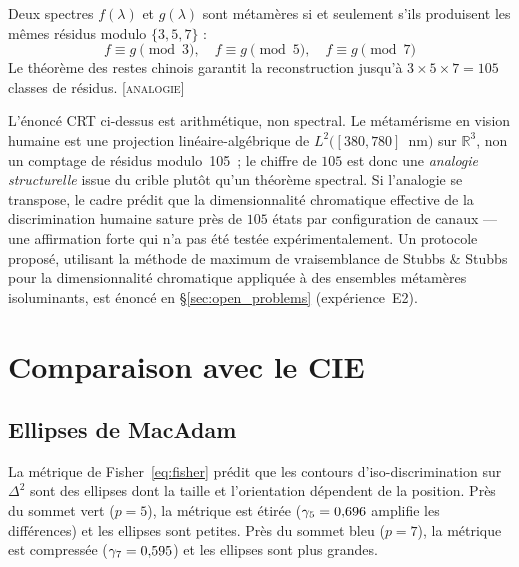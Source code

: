 \documentclass[12pt,a4paper]{article}
\begin{document}
\begin{theorembox}
Deux spectres $f(\lambda)$ et $g(\lambda)$ sont m\'etam\`eres si et
seulement s'ils produisent les m\^emes r\'esidus modulo $\{3, 5, 7\}$ :
\begin{equation}
  f \equiv g \pmod{3}, \quad
  f \equiv g \pmod{5}, \quad
  f \equiv g \pmod{7}
\end{equation}
Le th\'eor\`eme des restes chinois garantit la reconstruction jusqu'\`a
$3 \times 5 \times 7 = 105$ classes de r\'esidus. \textsc{[analogie]}
\end{theorembox}

\begin{remark}
L'\'enonc\'e CRT ci-dessus est arithm\'etique, non spectral. Le
m\'etam\'erisme en vision humaine est une projection
lin\'eaire-alg\'ebrique de $L^2([380, 780]$~nm$)$ sur $\mathbb{R}^3$,
non un comptage de r\'esidus modulo~105~; le chiffre de $105$ est
donc une \emph{analogie structurelle} issue du crible plut\^ot qu'un
th\'eor\`eme spectral. Si l'analogie se transpose, le cadre pr\'edit
que la dimensionnalit\'e chromatique effective de la discrimination
humaine sature pr\`es de $105$ \'etats par configuration de canaux
--- une affirmation forte qui n'a pas \'et\'e test\'ee
exp\'erimentalement. Un protocole propos\'e, utilisant la m\'ethode
de maximum de vraisemblance de Stubbs \& Stubbs pour la
dimensionnalit\'e chromatique appliqu\'ee \`a des ensembles
m\'etam\`eres isoluminants, est \'enonc\'e en \S\ref{sec:open_problems}
(exp\'erience~E2).
\end{remark}

\section{Comparaison avec le CIE}
\label{sec:comparison}

\subsection{Ellipses de MacAdam}

La m\'etrique de Fisher~\eqref{eq:fisher} pr\'edit que les contours
d'iso-discrimination sur $\Delta^2$ sont des ellipses dont la taille et
l'orientation d\'ependent de la position. Pr\`es du sommet vert
($p = 5$), la m\'etrique est \'etir\'ee ($\gamma_{5} = 0{,}696$ amplifie
les diff\'erences) et les ellipses sont petites. Pr\`es du sommet bleu
($p = 7$), la m\'etrique est compress\'ee ($\gamma_{7} = 0{,}595$) et les
ellipses sont plus grandes.
\end{document}
